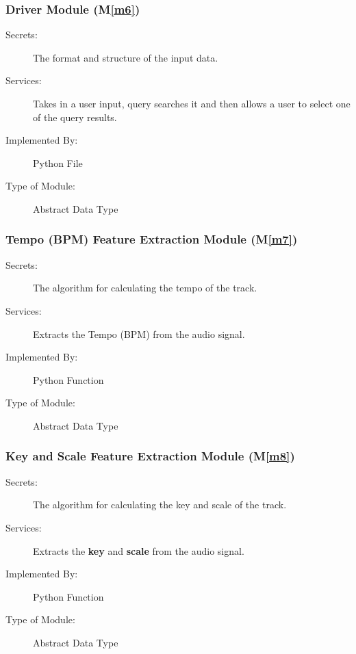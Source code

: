 \documentclass[12pt, titlepage]{article}
\newcommand{\mref}[1]{M\ref{#1}}
\begin{document}
\subsubsection{Driver Module (\mref{m6})}

\begin{description}
\item[Secrets:] The format and structure of the input data.
\item[Services:] Takes in a user input, query searches it and then allows a user to select one of the query results. 
\item[Implemented By:] Python File
\item[Type of Module:] Abstract Data Type
\end{description}

\subsubsection{Tempo (BPM) Feature Extraction Module (\mref{m7})}

\begin{description}
\item[Secrets:] The algorithm for calculating the tempo of the track. 
\item[Services:] Extracts the Tempo (BPM) from the audio signal. 
\item[Implemented By:] Python Function
\item[Type of Module:] Abstract Data Type
\end{description}

\subsubsection{Key and Scale Feature Extraction Module (\mref{m8})}

\begin{description}
\item[Secrets:] The algorithm for calculating the key and scale of the track. 
\item[Services:]Extracts the \textbf{key} and \textbf{scale} from the audio signal. 
\item[Implemented By:] Python Function
\item[Type of Module:] Abstract Data Type
\end{description}

\end{document}
